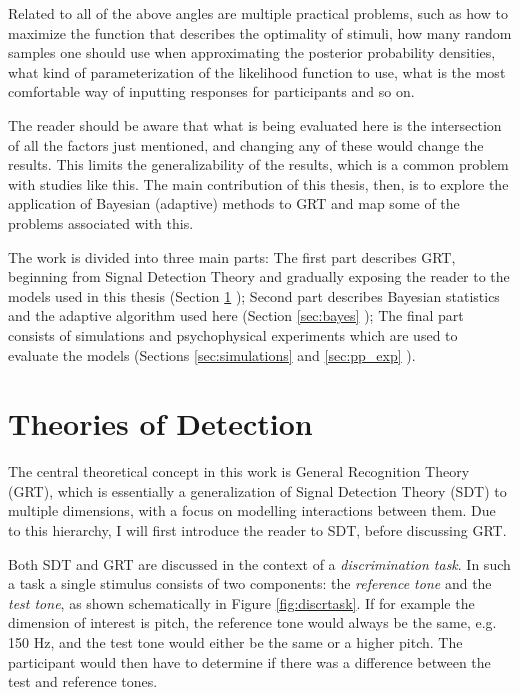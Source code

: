 \documentclass{article}\usepackage{knitr}
\begin{document}
Related to all of the above angles are multiple practical problems, such as how to maximize the function that describes the optimality of stimuli, how many random samples one should use when approximating the posterior probability densities, what kind of parameterization of the likelihood function to use, what is the most comfortable way of inputting responses for participants and so on. 

The reader should be aware that what is being evaluated here is the intersection of all the factors just mentioned, and changing any of these would change the results. This limits the generalizability of the results, which is a common problem with studies like this. The main contribution of this thesis, then, is to explore the application of Bayesian (adaptive) methods to GRT and map some of the problems associated with this.

The work is divided into three main parts: The first part describes GRT, beginning from Signal Detection Theory and gradually exposing the reader to the models used in this thesis (Section \ref{sec:GRT} \textit{}); Second part describes Bayesian statistics and the adaptive algorithm used here (Section \ref{sec:bayes} \textit{}); The final part consists of simulations and psychophysical experiments which are used to evaluate the models (Sections \ref{sec:simulations} \textit{} and \ref{sec:pp_exp} \textit{}).

\newpage


\section{Theories of Detection}
\label{sec:GRT}

The central theoretical concept in this work is General Recognition Theory (GRT), which is essentially a generalization of Signal Detection Theory (SDT) to multiple dimensions, with a focus on modelling interactions between them. Due to this hierarchy, I will first introduce the reader to SDT, before discussing GRT.

Both SDT and GRT are discussed in the context of a \textit{discrimination task}. In such a task a single stimulus consists of two components: the \textit{reference tone} and the \textit{test tone}, as shown schematically  in Figure \ref{fig:discrtask}. If for example the dimension of interest is pitch, the reference tone would always be the same, e.g. 150 Hz, and the test tone would either be the same or a higher pitch. The participant would then have to determine if there was a difference between the test and reference tones.
\end{document}
